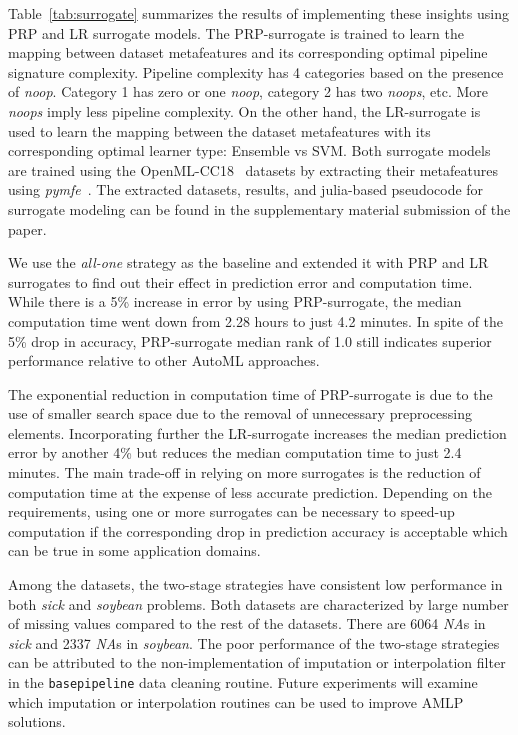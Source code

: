 \documentclass{juliacon}
\begin{document}
\vskip 6pt

Table~\ref{tab:surrogate} summarizes the results of implementing these
insights using PRP and LR surrogate models.
The PRP-surrogate is trained to learn the mapping between 
dataset metafeatures and its corresponding optimal pipeline 
signature complexity. Pipeline complexity has 4 categories based
on the presence of \emph{noop}. Category 1 has zero or one \emph{noop}, 
category 2 has two \emph{noops}, etc. More \emph{noops} imply 
less pipeline complexity. On the other hand, the LR-surrogate
is used to learn the mapping between the dataset metafeatures 
with its corresponding optimal learner type: Ensemble vs SVM. Both
surrogate models are trained using the OpenML-CC18~\cite{openmlcc18} 
datasets by extracting their metafeatures using \emph{pymfe}~\cite{pymfe2020}. The extracted datasets, results, and julia-based pseudocode for surrogate modeling can be found in the supplementary material submission of the paper.

\vskip 6pt

We use the \emph{all-one} strategy as the baseline and extended it with 
PRP and LR surrogates to find out their effect in prediction error
and computation time. While there is a 5\% increase in error by
using PRP-surrogate, the median computation time went down from 2.28
hours to just 4.2 minutes. In spite of the 5\% drop in accuracy,
PRP-surrogate median rank of 1.0 still indicates superior performance
relative to other AutoML approaches.

\vskip 6pt

The exponential reduction in computation time of PRP-surrogate 
is due to the use of smaller search space due to the removal of unnecessary 
preprocessing elements. Incorporating further the LR-surrogate
increases the median prediction error by another 4\% 
but reduces the median computation time to just 2.4 minutes. 
The main trade-off in relying on more surrogates is the reduction of 
computation time at the expense of less accurate prediction. 
Depending on the requirements, using one or more surrogates 
can be necessary to speed-up computation if the corresponding drop in 
prediction accuracy is acceptable which can be true in some 
application domains.

\vskip 6pt

Among the datasets, the two-stage strategies have consistent low performance in
both \emph{sick} and \emph{soybean} problems.  Both datasets are characterized
by large number of missing values compared to the rest of the datasets.
There are 6064 \emph{NA}s in \emph{sick} and 2337 \emph{NA}s in
\emph{soybean}. The poor performance of the two-stage strategies
can be attributed to the non-implementation of imputation or
interpolation filter in the \texttt{basepipeline} data
cleaning routine. Future experiments
will examine which imputation or interpolation routines
can be used to improve AMLP solutions.
\end{document}
